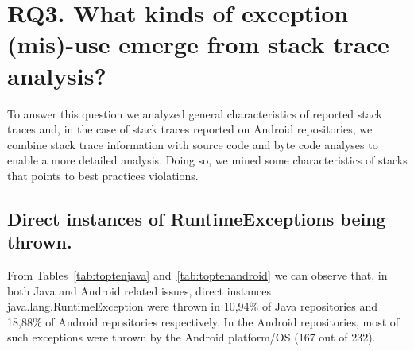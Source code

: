 \documentclass[conference]{IEEEtran}
\begin{document}



\section{RQ3.  What kinds of exception (mis)-use emerge from stack trace analysis? }

To answer this question we analyzed general characteristics of reported stack traces and, in the case of stack traces reported on Android repositories, we combine stack trace information with
source code and byte code analyses to enable a more detailed analysis.
Doing so, we mined some characteristics of stacks that points to best practices violations.

\subsection{Direct instances of RuntimeExceptions being thrown.}

From Tables~\ref{tab:toptenjava} and~\ref{tab:toptenandroid} we can observe that,
in both Java and Android related issues, direct instances
java.lang.RuntimeException were thrown  in 10,94\% of Java repositories and
18,88\% of Android repositories respectively. 
In the Android repositories, most of such exceptions  were  thrown by the Android 
platform/OS (167 out of 232).
\end{document}
